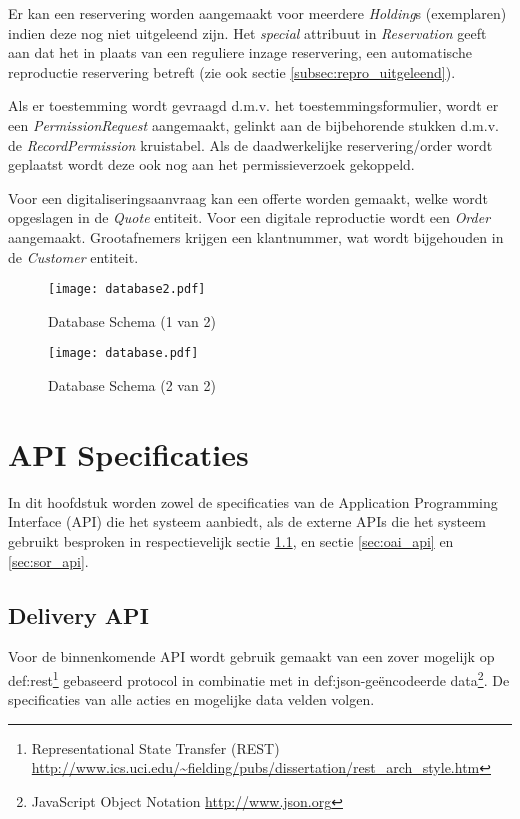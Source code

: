 \documentclass[a4paper,titlepage]{report}
\begin{document}
Er kan een reservering worden aangemaakt voor meerdere \emph{Holding}s
(exemplaren) indien deze nog
niet uitgeleend zijn. Het \emph{special} attribuut in \emph{Reservation} geeft
aan dat het in plaats van een reguliere inzage reservering, een automatische
reproductie reservering betreft (zie ook sectie \ref{subsec:repro_uitgeleend}).

Als er toestemming wordt gevraagd d.m.v. het toestemmingsformulier, wordt er
een \emph{PermissionRequest} aangemaakt, gelinkt aan de bijbehorende stukken
d.m.v. de \emph{RecordPermission} kruistabel. Als de daadwerkelijke
reservering/order wordt geplaatst wordt deze ook nog aan het permissieverzoek
gekoppeld.

Voor een digitaliseringsaanvraag kan een offerte worden gemaakt, welke wordt
opgeslagen in de \emph{Quote} entiteit. Voor een digitale reproductie wordt
een \emph{Order} aangemaakt. Grootafnemers krijgen een klantnummer, wat wordt
bijgehouden in de \emph{Customer} entiteit.


  \begin{figure}[H]
    \label{fig:db2}
    \centering
    \texttt{[image: database2.pdf]}
    \caption{Database Schema (1 van 2)}
  \end{figure}


  \begin{figure}[H]
    \label{fig:db}
    \centering
    \texttt{[image: database.pdf]}
    \caption{Database Schema (2 van 2)}
  \end{figure}
  


\chapter{API Specificaties}
\label{cha:api}
In dit hoofdstuk worden zowel de specificaties van de Application Programming
Interface (API) die het systeem aanbiedt, als de externe APIs die het
systeem gebruikt besproken in
respectievelijk sectie \ref{sec:resev}, en sectie \ref{sec:oai_api} en
\ref{sec:sor_api}.

  \section{Delivery API}
  \label{sec:resev}
    Voor de binnenkomende API wordt gebruik gemaakt van een zover mogelijk op
    \gls{def:rest}\footnote{Representational State Transfer (REST)
 \url{http://www.ics.uci.edu/~fielding/pubs/dissertation/rest_arch_style.htm}}
    gebaseerd protocol in combinatie met in \gls{def:json}-ge\"encodeerde
    data\footnote{JavaScript Object Notation \url{http://www.json.org}}. De
    specificaties van alle acties en mogelijke data velden volgen.
\end{document}
